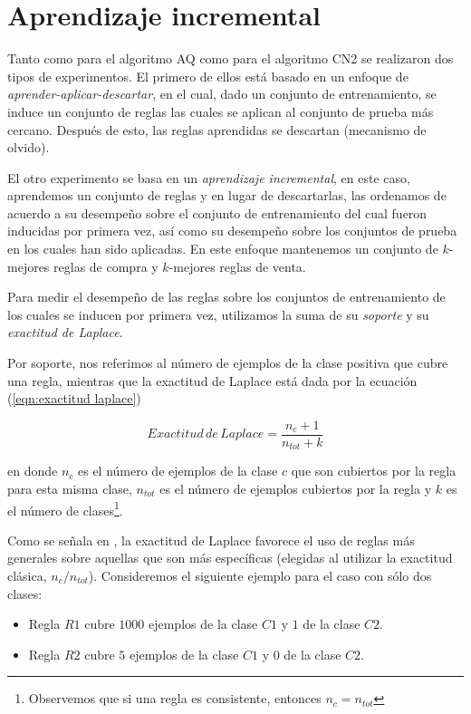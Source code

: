 \documentclass[12pt]{report}
\theoremstyle{break}
\theoremstyle{break}
\begin{document}
\section{Aprendizaje incremental}
\label{seccion:aprendizaje incremental}
Tanto como para el algoritmo AQ como para el algoritmo CN2 se realizaron dos tipos de experimentos. El primero de ellos está basado en un enfoque de \textit{aprender-aplicar-descartar}, en el cual, dado un conjunto de entrenamiento, se induce un conjunto de reglas las cuales se aplican al conjunto de prueba más cercano. Después de esto, las reglas aprendidas se descartan (mecanismo de olvido).

El otro experimento se basa en un \textit{aprendizaje incremental}, en este caso, aprendemos un conjunto de reglas y en lugar de descartarlas, las ordenamos de acuerdo a su desempeño sobre el conjunto de entrenamiento del cual fueron inducidas por primera vez, así como su desempeño sobre los conjuntos de prueba en los cuales han sido aplicadas. En este enfoque mantenemos un conjunto de $k$-mejores reglas de compra y $k$-mejores reglas de venta.

Para medir el desempeño de las reglas sobre los conjuntos de entrenamiento de los cuales se inducen por primera vez, utilizamos la suma de su \textit{soporte} y su \textit{exactitud de Laplace}.

Por soporte, nos referimos al número de ejemplos de la clase positiva que cubre una regla, mientras que la exactitud de Laplace está dada por la ecuación (\ref{eqn:exactitud laplace})

\begin{equation}\label{eqn:exactitud laplace}
Exactitud\,de\,Laplace = \dfrac{ n_{c} + 1 }{ n_{tot} + k }
\end{equation}

en donde $n_c$ es el número de ejemplos de la clase $c$ que son cubiertos por la regla para esta misma clase, $n_{tot}$ es el número de ejemplos cubiertos por la regla y $k$ es el número de clases\footnote{Observemos que si una regla es consistente, entonces $n_c = n_{tot}$}.

Como se señala en \cite{CN2Improvements}, la exactitud de Laplace favorece el uso de reglas más generales sobre aquellas que son más específicas (elegidas al utilizar la exactitud clásica, $n_{c} / n_{tot} $). Consideremos el siguiente ejemplo para el caso con sólo dos clases:

\begin{itemize} 
\item Regla $R1$ cubre $1000$ ejemplos de la clase $C1$ y $1$ de la clase $C2$.

\item Regla $R2$ cubre $5$ ejemplos de la clase $C1$ y $0$ de la clase $C2$.
\end{itemize}
\end{document}
